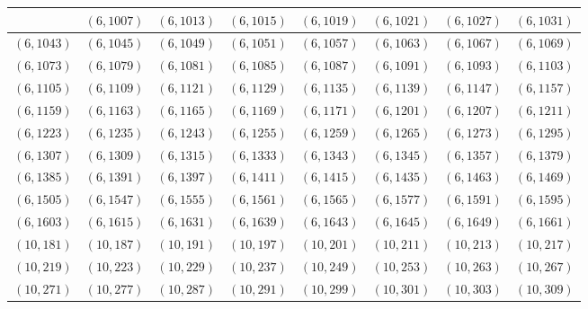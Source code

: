 \documentclass[11pt,reqno]{amsart}
\theoremstyle{definition}
\begin{document}
\begin{longtable}{|c|c|c|c|c|c|c|c|}
 & 
$ ( 6 , 1007 )$
 & 
$ ( 6 , 1013 )$
 & 
$ ( 6 , 1015 )$
 & 
$ ( 6 , 1019 )$
 & 
$ ( 6 , 1021 )$
 & 
$ ( 6 , 1027 )$
 & 
$ ( 6 , 1031 )$
\\ \hline
$ ( 6 , 1043 )$
 & 
$ ( 6 , 1045 )$
 & 
$ ( 6 , 1049 )$
 & 
$ ( 6 , 1051 )$
 & 
$ ( 6 , 1057 )$
 & 
$ ( 6 , 1063 )$
 & 
$ ( 6 , 1067 )$
 & 
$ ( 6 , 1069 )$
\\ \hline
$ ( 6 , 1073 )$
 & 
$ ( 6 , 1079 )$
 & 
$ ( 6 , 1081 )$
 & 
$ ( 6 , 1085 )$
 & 
$ ( 6 , 1087 )$
 & 
$ ( 6 , 1091 )$
 & 
$ ( 6 , 1093 )$
 & 
$ ( 6 , 1103 )$
\\ \hline
$ ( 6 , 1105 )$
 & 
$ ( 6 , 1109 )$
 & 
$ ( 6 , 1121 )$
 & 
$ ( 6 , 1129 )$
 & 
$ ( 6 , 1135 )$
 & 
$ ( 6 , 1139 )$
 & 
$ ( 6 , 1147 )$
 & 
$ ( 6 , 1157 )$
\\ \hline
$ ( 6 , 1159 )$
 & 
$ ( 6 , 1163 )$
 & 
$ ( 6 , 1165 )$
 & 
$ ( 6 , 1169 )$
 & 
$ ( 6 , 1171 )$
 & 
$ ( 6 , 1201 )$
 & 
$ ( 6 , 1207 )$
 & 
$ ( 6 , 1211 )$
\\ \hline
$ ( 6 , 1223 )$
 & 
$ ( 6 , 1235 )$
 & 
$ ( 6 , 1243 )$
 & 
$ ( 6 , 1255 )$
 & 
$ ( 6 , 1259 )$
 & 
$ ( 6 , 1265 )$
 & 
$ ( 6 , 1273 )$
 & 
$ ( 6 , 1295 )$
\\ \hline
$ ( 6 , 1307 )$
 & 
$ ( 6 , 1309 )$
 & 
$ ( 6 , 1315 )$
 & 
$ ( 6 , 1333 )$
 & 
$ ( 6 , 1343 )$
 & 
$ ( 6 , 1345 )$
 & 
$ ( 6 , 1357 )$
 & 
$ ( 6 , 1379 )$
\\ \hline
$ ( 6 , 1385 )$
 & 
$ ( 6 , 1391 )$
 & 
$ ( 6 , 1397 )$
 & 
$ ( 6 , 1411 )$
 & 
$ ( 6 , 1415 )$
 & 
$ ( 6 , 1435 )$
 & 
$ ( 6 , 1463 )$
 & 
$ ( 6 , 1469 )$
\\ \hline
$ ( 6 , 1505 )$
 & 
$ ( 6 , 1547 )$
 & 
$ ( 6 , 1555 )$
 & 
$ ( 6 , 1561 )$
 & 
$ ( 6 , 1565 )$
 & 
$ ( 6 , 1577 )$
 & 
$ ( 6 , 1591 )$
 & 
$ ( 6 , 1595 )$
\\ \hline
$ ( 6 , 1603 )$
 & 
$ ( 6 , 1615 )$
 & 
$ ( 6 , 1631 )$
 & 
$ ( 6 , 1639 )$
 & 
$ ( 6 , 1643 )$
 & 
$ ( 6 , 1645 )$
 & 
$ ( 6 , 1649 )$
 & 
$ ( 6 , 1661 )$
\\ \hline
$ ( 10 , 181 )$
 & 
$ ( 10 , 187 )$
 & 
$ ( 10 , 191 )$
 & 
$ ( 10 , 197 )$
 & 
$ ( 10 , 201 )$
 & 
$ ( 10 , 211 )$
 & 
$ ( 10 , 213 )$
 & 
$ ( 10 , 217 )$
\\ \hline
$ ( 10 , 219 )$
 & 
$ ( 10 , 223 )$
 & 
$ ( 10 , 229 )$
 & 
$ ( 10 , 237 )$
 & 
$ ( 10 , 249 )$
 & 
$ ( 10 , 253 )$
 & 
$ ( 10 , 263 )$
 & 
$ ( 10 , 267 )$
\\ \hline
$ ( 10 , 271 )$
 & 
$ ( 10 , 277 )$
 & 
$ ( 10 , 287 )$
 & 
$ ( 10 , 291 )$
 & 
$ ( 10 , 299 )$
 & 
$ ( 10 , 301 )$
 & 
$ ( 10 , 303 )$
 & 
$ ( 10 , 309 )$

\end{longtable}
\end{document}
